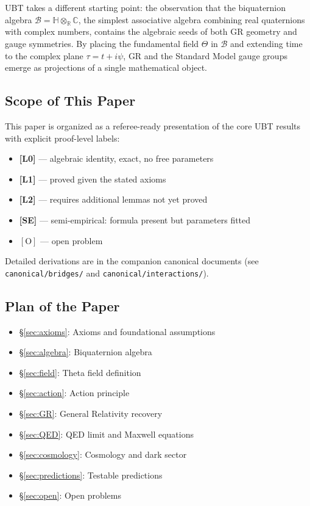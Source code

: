 \documentclass[12pt,a4paper]{article}
\newcommand{\Lzero}{\textbf{[L0]}}
\newcommand{\Lone}{\textbf{[L1]}}
\newcommand{\Ltwo}{\textbf{[L2]}}
\newcommand{\SE}{\textbf{[SE]}}
\begin{document}
UBT takes a different starting point: the observation that the biquaternion
algebra $\mathcal{B} = \mathbb{H}\otimes_\mathbb{R}\mathbb{C}$, the simplest
associative algebra combining real quaternions with complex numbers, contains
the algebraic seeds of both GR geometry and gauge symmetries.
By placing the fundamental field $\Theta$ in $\mathcal{B}$ and extending
time to the complex plane $\tau = t + i\psi$, GR and the Standard Model
gauge groups emerge as projections of a single mathematical object.

\subsection{Scope of This Paper}

This paper is organized as a referee-ready presentation of the core UBT
results with explicit proof-level labels:
\begin{itemize}
  \item \Lzero{} — algebraic identity, exact, no free parameters
  \item \Lone{} — proved given the stated axioms
  \item \Ltwo{} — requires additional lemmas not yet proved
  \item \SE{} — semi-empirical: formula present but parameters fitted
  \item $[\mathrm{O}]$ — open problem
\end{itemize}

\noindent Detailed derivations are in the companion canonical documents
(see \texttt{canonical/bridges/} and \texttt{canonical/interactions/}).

\subsection{Plan of the Paper}

\begin{itemize}
  \item \S\ref{sec:axioms}: Axioms and foundational assumptions
  \item \S\ref{sec:algebra}: Biquaternion algebra
  \item \S\ref{sec:field}: Theta field definition
  \item \S\ref{sec:action}: Action principle
  \item \S\ref{sec:GR}: General Relativity recovery
  \item \S\ref{sec:QED}: QED limit and Maxwell equations
  \item \S\ref{sec:cosmology}: Cosmology and dark sector
  \item \S\ref{sec:predictions}: Testable predictions
  \item \S\ref{sec:open}: Open problems
\end{itemize}
\end{document}
